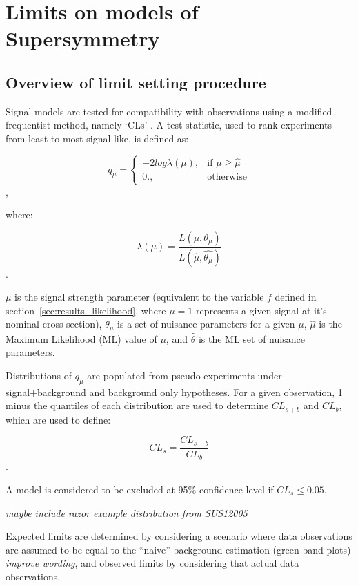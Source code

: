 \section{Limits on models of Supersymmetry}  %
\label{sec:interpretation_limits}

\subsection{Overview of limit setting procedure}
Signal models are tested for compatibility with observations using
a modified frequentist method, namely `CLs' \cite{alread-cls}. A test statistic,
used to rank
experiments from least to most signal-like, is defined as:

\begin{equation}
q_{\mu} = \begin{cases} -2log\lambda(\mu), & \mbox{if } \mu \geq \hat{\mu} \\
0., & \mbox{otherwise} \end{cases}
\end{equation},

where:

\begin{equation}
\lambda(\mu) = \frac{L(\mu, \theta_{\mu})}{L(\hat{\mu}, \hat{\theta_{\mu}})}
\end{equation}.

$\mu$ is the signal strength parameter (equivalent to the variable $f$ defined
in section~\ref{sec:results_likelihood}, where $\mu=1$ represents a given
signal at it's nominal cross-section), $\theta_{\mu}$ is a set of nuisance 
parameters for a given $\mu$, $\hat {\mu}$ is the Maximum Likelihood
(ML) value of $\mu$, and $\hat{\theta}$ is the ML set of nuisance parameters.

Distributions of $q_{\mu}$ are populated from pseudo-experiments under
signal+background and background only hypotheses. For a given observation, 1
minus the quantiles of each distribution are used to determine $CL_{s+b}$ and
$CL_b$, which are used to define:

\begin{equation}
CL_s = \frac{CL_{s+b}}{CL_b}
\end{equation}.

A model is considered to be excluded at 95\% confidence level if
$CL_s \leq 0.05$.

\emph{maybe include razor example distribution from SUS12005}

Expected limits are determined by considering a scenario where data observations
are assumed to be equal to the ``naive'' background estimation (green band
plots) \emph{improve wording}, and observed limits by considering that actual
data observations.

